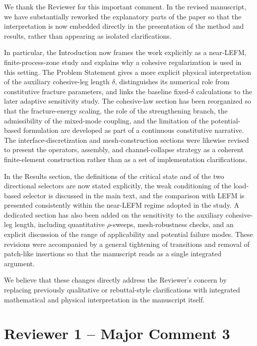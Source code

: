 \documentclass[12pt,a4paper]{article}
\begin{document}
	\begin{tcolorbox}[authorbox]
		We thank the Reviewer for this important comment. In the revised manuscript, we have substantially reworked the explanatory parts of the paper so that the interpretation is now embedded directly in the presentation of the method and results, rather than appearing as isolated clarifications.
		
		In particular, the Introduction now frames the work explicitly as a near-LEFM, finite-process-zone study and explains why a cohesive regularization is used in this setting. The Problem Statement gives a more explicit physical interpretation of the auxiliary cohesive-leg length \(\delta\), distinguishes its numerical role from constitutive fracture parameters, and links the baseline fixed-\(\delta\) calculations to the later adaptive sensitivity study. The cohesive-law section has been reorganized so that the fracture-energy scaling, the role of the strengthening branch, the admissibility of the mixed-mode coupling, and the limitation of the potential-based formulation are developed as part of a continuous constitutive narrative. The interface-discretization and mesh-construction sections were likewise revised to present the operators, assembly, and channel-collapse strategy as a coherent finite-element construction rather than as a set of implementation clarifications.
		
		In the Results section, the definitions of the critical state and of the two directional selectors are now stated explicitly, the weak conditioning of the load-based selector is discussed in the main text, and the comparison with LEFM is presented consistently within the near-LEFM regime adopted in the study. A dedicated section has also been added on the sensitivity to the auxiliary cohesive-leg length, including quantitative \(\rho\)-sweeps, mesh-robustness checks, and an explicit discussion of the range of applicability and potential failure modes. These revisions were accompanied by a general tightening of transitions and removal of patch-like insertions so that the manuscript reads as a single integrated argument.
		
		We believe that these changes directly address the Reviewer’s concern by replacing previously qualitative or rebuttal-style clarifications with integrated mathematical and physical interpretation in the manuscript itself.
	\end{tcolorbox}
	
	\section*{Reviewer 1 -- Major Comment 3}
	
\end{document}

